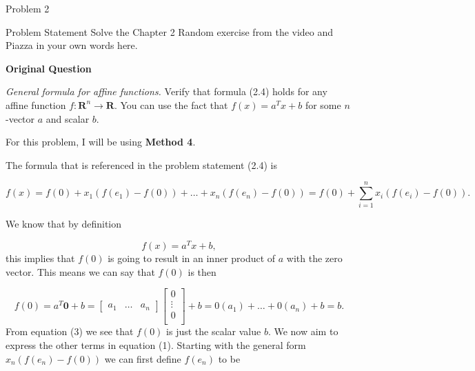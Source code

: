 \begin{problem}{Problem 2}
    \begin{statement}{Problem Statement}
        Solve the Chapter 2 Random exercise from the video and Piazza in your own words here. \vspace*{1em}

        \textbf{Original Question} \vspace*{1em}

        \textit{General formula for affine functions.} Verify that formula (2.4) holds for any affine function $f:\mathbf{R}^{n}\rightarrow\mathbf{R}$. You can use the fact that $f(x) = a^{T}x + b$ for some $n$-vector $a$ 
        and scalar $b$.
    \end{statement}

    \begin{highlight}[Solution]
        For this problem, I will be using \textbf{Method 4}. \vspace*{1em}

        The formula that is referenced in the problem statement (2.4) is 

        \setcounter{equation}{0}
        \begin{equation}
            f(x) = f(0) + x_{1}(f(e_{1}) - f(0)) + \dots + x_{n}(f(e_{n}) - f(0)) = f(0) + \sum^{n}_{i = 1} x_{i}(f(e_{i}) - f(0)).
        \end{equation}

        We know that by definition 

        \begin{equation}
            f(x) = a^{T}x + b,
        \end{equation}
        this implies that $f(0)$ is going to result in an inner product of $a$ with the zero vector. This means we can say that $f(0)$ is then

        \begin{equation}
            f(0) = a^{T}\mathbf{0} + b = 
            \begin{bmatrix}
                a_{1} & \dots & a_{n}
            \end{bmatrix}
            \begin{bmatrix}
                0 \\
                \vdots \\
                0 \\
            \end{bmatrix}
            + b = 0(a_{1}) + \dots + 0(a_{n}) + b = b.
        \end{equation}
        From equation (3) we see that $f(0)$ is just the scalar value $b$. We now aim to express the other terms in equation (1). Starting with the general form $x_{n}(f(e_{n}) - f(0))$ we can first
        define $f(e_{n})$ to be


\end{highlight}
\end{problem}
